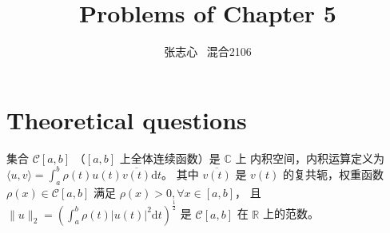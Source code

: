 \documentclass[lang=cn,a4paper,newtx,bibend=bibtex]{elegantpaper}
\title{Problems of Chapter 5}
\author{张志心 \ 混合2106}
\date{\zhdate{2023/12/20}}
\begin{document}
\maketitle

\section{Theoretical questions}

\begin{prob}

集合 $\mathcal{C}[a, b]$ （$[a, b]$ 上全体连续函数）是 $\mathbb{C}$ 上
内积空间，内积运算定义为 $\langle  u, v \rangle = \int_a^b \rho(t)u(t)\overline{v(t)} \mathrm{d}t$。
其中 $\overline{v(t)}$ 是 $v(t)$ 的复共轭，权重函数 $\rho(x) \in \mathcal{C}[a, b]$ 满足
$\rho(x) > 0, \forall x \in [a, b]$，
且 $\| u \|_2 = \left(\int_a^b \rho(t)|u(t)|^2\mathrm{d}t\right)^{\frac12}$ 
是 $\mathcal{C}[a, b]$ 在 $\mathbb{R}$ 上的范数。

\end{prob}
\end{document}
